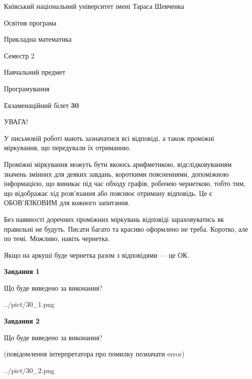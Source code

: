 \documentclass[12pt, ukrainian]{article}
\begin{document}
{{\begin {small}\par
{ \center  Київський національний університет імені Тараса Шевченка \par}
{\parbox {5 cm}{Освітня програма \hfill}{\parbox {7 cm}{Прикладна математика\hfill}}\parbox {6 cm}{\hfill Семестр 2}}\par
{\parbox {5 cm} {Навчальний предмет \hfill}\parbox {7 cm}{Програмування \hfill}\parbox {6cm}{\hfill}\par}\vspace{-7pt} \end{small}}{\center Екзаменаційний білет \No \textbf
{ 30 }\par}}
{
\begin {large}
УВАГА!

У письмовій роботі мають зазначатися всі відповіді, а також проміжні міркування, що передували їх отриманню.

Проміжні міркування можуть бути якоюсь арифметикою, відслідковуванням зна\-чень змінних для деяких завдань,
короткими поясненнями, допоміжною інформацією, що виникає під час обходу графів, робочею чернеткою,
тобто тим, що відображає хід розв’язання або пояснює отриману відповідь.
Це є ОБОВ’ЯЗКОВИМ для кожного запитання.

Без наявності доречних проміжних міркувань відповіді зараховуватись як правиль\-ні не будуть.
Писати багато та красиво оформлено не треба. Коротко, але по темі. Можли\-во, навіть чернетка.

Якщо на аркуші буде чернетка разом з відповідями --- це ОК.

\newpage

{\begin {center}\textbf{Завдання 1}\end {center}}\par
Що буде виведено за виконання?\par
\begin{center}
	{../pict/30_1.png}
\end{center}
\newpage

{\begin {center}\textbf{Завдання 2}\end {center}}\par
Що буде виведено за виконання?\par
 (повідомлення інтерпретатора про помилку позначати error)\par
\begin{center}
	{../pict/30_2.png}
\end{center}
\newpage


\end{large}}
\end{document}
